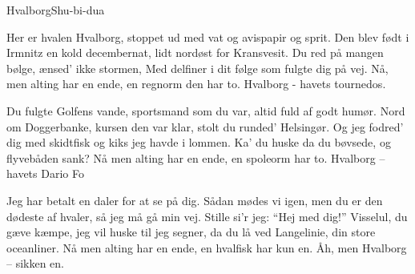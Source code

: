 \begin{sang}{Hvalborg}{Shu-bi-dua}
\begin{vers}
Her er hvalen Hvalborg,
stoppet ud med vat
og avispapir og sprit. 
Den blev født i Irmnitz
en kold decembernat,
lidt nordøst for Kransvesit. 
Du red på mangen bølge,
ænsed' ikke stormen, 
Med delfiner i dit følge
som fulgte dig på vej. 
Nå, men alting har en ende,
en regnorm den har to.
Hvalborg - havets tournedos.
\end{vers}

\begin{vers}
Du fulgte Golfens vande,
sportsmand som du var,
altid fuld af godt humør.
Nord om Doggerbanke,
kursen den var klar,
stolt du runded' Helsingør.
Og jeg fodred' dig med skidtfisk
og kiks jeg havde i lommen.
Ka' du huske da du bøvsede, 
og flyvebåden sank?
Nå men alting har en ende,
en spoleorm har to.
Hvalborg -- havets Dario Fo
\end{vers}

\begin{vers}
Jeg har betalt en daler
for at se på dig.
Sådan mødes vi igen,
men du er den dødeste af hvaler,
så jeg må gå min vej.
Stille si'r jeg: "`Hej med dig!"'
Visselul, du gæve kæmpe,
jeg vil huske til jeg segner,
da du lå ved Langelinie,
din store oceanliner.
Nå men alting har en ende,
en hvalfisk har kun en.
Åh, men Hvalborg -- sikken en.
\end{vers}
\laps

\end{sang}